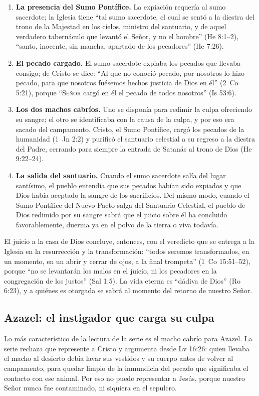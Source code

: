\documentclass[11pt,letterpaper]{article}
\newcommand{\SENOR}{\textsc{Señor}}
\begin{document}
\begin{enumerate}\setlength{\itemsep}{2pt}
\item \textbf{La presencia del Sumo Pontífice.} La expiación requería al sumo sacerdote; la Iglesia tiene ``tal sumo sacerdote, el cual se sentó a la diestra del trono de la Majestad en los cielos, ministro del santuario, y de aquel verdadero tabernáculo que levantó el Señor, y no el hombre'' (He 8:1--2), ``santo, inocente, sin mancha, apartado de los pecadores'' (He 7:26).
\item \textbf{El pecado cargado.} El sumo sacerdote expiaba los pecados que llevaba consigo; de Cristo se dice: ``Al que no conoció pecado, por nosotros lo hizo pecado, para que nosotros fuésemos hechos justicia de Dios en él'' (2~Co 5:21), porque ``\SENOR{} cargó en él el pecado de todos nosotros'' (Is 53:6).
\item \textbf{Los dos machos cabríos.} Uno se disponía para redimir la culpa ofreciendo su sangre; el otro se identificaba con la causa de la culpa, y por eso era sacado del campamento. Cristo, el Sumo Pontífice, cargó los pecados de la humanidad (1~Jn 2:2) y purificó el santuario celestial a su regreso a la diestra del Padre, cerrando para siempre la entrada de Satanás al trono de Dios (He 9:22--24).
\item \textbf{La salida del santuario.} Cuando el sumo sacerdote salía del lugar santísimo, el pueblo entendía que sus pecados habían sido expiados y que Dios había aceptado la sangre de los sacrificios. Del mismo modo, cuando el Sumo Pontífice del Nuevo Pacto salga del Santuario Celestial, el pueblo de Dios redimido por su sangre sabrá que el juicio sobre él ha concluido favorablemente, duerma ya en el polvo de la tierra o viva todavía.
\end{enumerate}

El juicio a la casa de Dios concluye, entonces, con el veredicto que se entrega a la Iglesia en la resurrección y la transformación: ``todos seremos transformados, en un momento, en un abrir y cerrar de ojos, a la final trompeta'' (1~Co 15:51--52), porque ``no se levantarán los malos en el juicio, ni los pecadores en la congregación de los justos'' (Sal 1:5). La vida eterna es ``dádiva de Dios'' (Ro 6:23), y a quiénes es otorgada se sabrá al momento del retorno de nuestro Señor.

\subsection{Azazel: el instigador que carga su culpa}
Lo más característico de la lectura de la serie es el macho cabrío para Azazel. La serie rechaza que represente a Cristo y argumenta desde Lv 16:26: quien llevaba el macho al desierto debía lavar sus vestidos y su cuerpo antes de volver al campamento, para quedar limpio de la inmundicia del pecado que significaba el contacto con ese animal. Por eso no puede representar a Jesús, porque nuestro Señor nunca fue contaminado, ni siquiera en el sepulcro.
\end{document}
